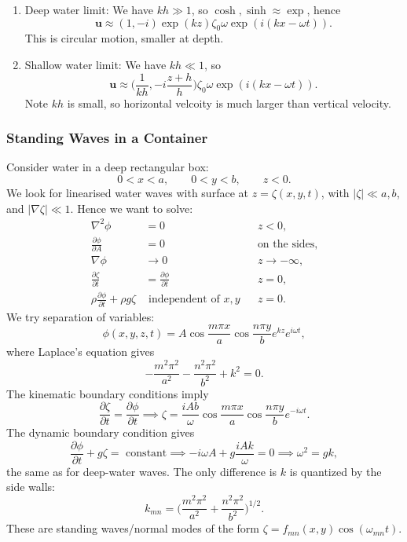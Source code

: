 \documentclass[12pt]{article}
\begin{document}
\begin{enumerate}
	\item Deep water limit: We have $kh \gg 1$, so $\cosh, \sinh \approx \exp$, hence
		\[
			\mathbf{u} \approx (1, -i) \exp(kz) \zeta_0 \omega \exp(i(kx - \omega t)).
		\]
		This is circular motion, smaller at depth.
	\item Shallow water limit: We have $kh \ll 1$, so
		\[
		\mathbf{u} \approx \biggl( \frac{1}{kh}, -i \frac{z+h}{h} \biggr) \zeta_0 \omega \exp(i(kx - \omega t)).
		\]
		Note $kh$ is small, so horizontal velcoity is much larger than vertical velocity.
\end{enumerate}

\subsubsection{Standing Waves in a Container}
\label{subsub:standing_waves_in_a_container}

Consider water in a deep rectangular box:
\[
0 < x < a, \qquad 0 < y < b, \qquad z < 0.
\]
We look for linearised water waves with surface at $z = \zeta(x, y, t)$, with $|\zeta| \ll a, b$, and $|\nabla \zeta| \ll 1$. Hence we want to solve:
\begin{align*}
	\nabla^2 \phi &= 0 & &z<0, \\
	\frac{\partial \phi}{\partial A} &= 0 & &\text{on the sides},\\
	\nabla \phi &\to 0 & &z \to -\infty, \\
	\frac{\partial \zeta}{\partial t} &= \frac{\partial \phi}{\partial t} & &z = 0,\\
	\rho \frac{\partial \phi}{\partial t} + \rho g \zeta &\text{ independent of } x, y & &z = 0.
\end{align*}
We try separation of variables:
\[
\phi(x, y, z, t) = A \cos \frac{m \pi x}{a} \cos \frac{n \pi y}{b} e^{kz} e^{i \omega t},
\]
where Laplace's equation gives
\[
- \frac{m^2 \pi^2}{a^2} - \frac{n^2 \pi^2}{b^2} + k^2 = 0.
\]
The kinematic boundary conditions imply
\[
\frac{\partial \zeta}{\partial t} = \frac{\partial \phi}{\partial t} \implies \zeta = \frac{iAb}{\omega} \cos \frac{m \pi x}{a} \cos \frac{n \pi y}{b} e^{-i \omega t}.
\]
The dynamic boundary condition gives
\[
	\frac{\partial \phi}{\partial t} + g \zeta = \text{ constant} \implies -i \omega A + g\frac{i A k}{\omega} = 0 \implies \omega^2 = gk,
\]
the same as for deep-water waves. The only difference is $k$ is quantized by the side walls:
\[
k_{mn} = \biggl( \frac{m^2 \pi^2}{a^2} + \frac{n^2 \pi^2}{b^2} \biggr)^{1/2}.
\]
These are standing waves/normal modes of the form $\zeta = f_{mn}(x, y) \cos(\omega_{mn} t)$.
\end{document}
